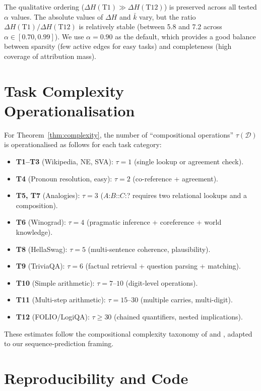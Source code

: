 \documentclass{article}
\newcommand{\DeltaH}{\Delta H}
\begin{document}
The qualitative ordering ($\DeltaH(\mathrm{T1}) \gg \DeltaH(\mathrm{T12})$) is
preserved across all tested $\alpha$ values.  The absolute values of $\DeltaH$ and
$\bar k$ vary, but the ratio $\DeltaH(\mathrm{T1})/\DeltaH(\mathrm{T12})$ is
relatively stable (between 5.8 and 7.2 across $\alpha \in [0.70, 0.99]$).
We use $\alpha = 0.90$ as the default, which provides a good balance between
sparsity (few active edges for easy tasks) and completeness (high coverage of
attribution mass).

\section{Task Complexity Operationalisation}
\label{app:task_complexity}

For Theorem~\ref{thm:complexity}, the number of ``compositional operations''
$\tau(\mathcal{D})$ is operationalised as follows for each task category:

\begin{itemize}
  \item \textbf{T1--T3} (Wikipedia, NE, SVA): $\tau = 1$ (single lookup or agreement check).
  \item \textbf{T4} (Pronoun resolution, easy): $\tau = 2$ (co-reference + agreement).
  \item \textbf{T5, T7} (Analogies): $\tau = 3$ ($A$:$B$::$C$:? requires two relational
        lookups and a composition).
  \item \textbf{T6} (Winograd): $\tau = 4$ (pragmatic inference + coreference + world knowledge).
  \item \textbf{T8} (HellaSwag): $\tau = 5$ (multi-sentence coherence, plausibility).
  \item \textbf{T9} (TriviaQA): $\tau = 6$ (factual retrieval + question parsing + matching).
  \item \textbf{T10} (Simple arithmetic): $\tau = 7$--$10$ (digit-level operations).
  \item \textbf{T11} (Multi-step arithmetic): $\tau = 15$--$30$ (multiple carries, multi-digit).
  \item \textbf{T12} (FOLIO/LogiQA): $\tau \geq 30$ (chained quantifiers, nested implications).
\end{itemize}

These estimates follow the compositional complexity taxonomy of
\citet{press2022measuring} and \citet{srivastava2022beyond}, adapted to our
sequence-prediction framing.

\section{Reproducibility and Code}
\label{app:repro}
\end{document}
